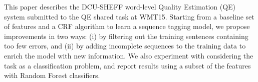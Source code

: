This paper describes the DCU-SHEFF word-level Quality Estimation (QE) system submitted to the QE shared task at WMT15. Starting from a baseline set of features and a CRF algorithm to learn a sequence tagging model, we propose improvements in two ways: (i) by filtering out the training sentences containing too few errors, and (ii) by adding incomplete sequences to the training data to enrich the model with new information. We also experiment with considering the task as a classification problem, and report results using a subset of the features with Random Forest classifiers.
